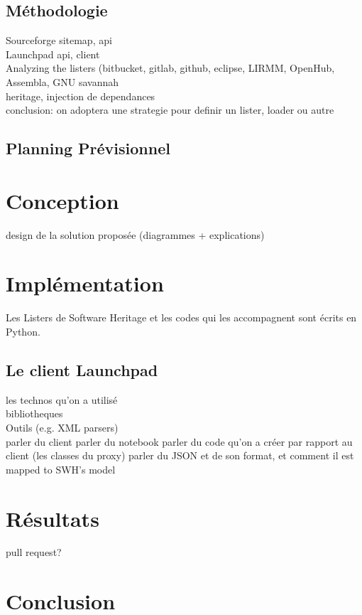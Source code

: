 \documentclass[12pt,a4paper]{report}
\begin{document}
\section{Méthodologie}		
	Sourceforge sitemap, api\\
	Launchpad api, client\\
	Analyzing the listers (bitbucket, gitlab, github, eclipse, LIRMM, OpenHub, 			Assembla, GNU savannah\\
	heritage, injection de dependances\\
	conclusion: on adoptera une strategie pour definir un lister, loader ou autre\\
\section{Planning Prévisionnel}
\chapter{Conception}
	design de la solution proposée (diagrammes + explications)
\chapter{Implémentation}
	Les Listers de Software Heritage et les codes qui les accompagnent sont écrits en Python. 
	
	\section{Le client Launchpad}
	les technos qu'on a utilisé\\
	bibliotheques\\
	Outils (e.g. XML parsers)\\
	parler du client
	parler du notebook
	parler du code qu'on a créer par rapport au client (les classes du proxy)
	parler du JSON et de son format, et comment il est mapped to SWH's model
		
\chapter{Résultats}
	pull request?
\chapter{Conclusion}
\end{document}

